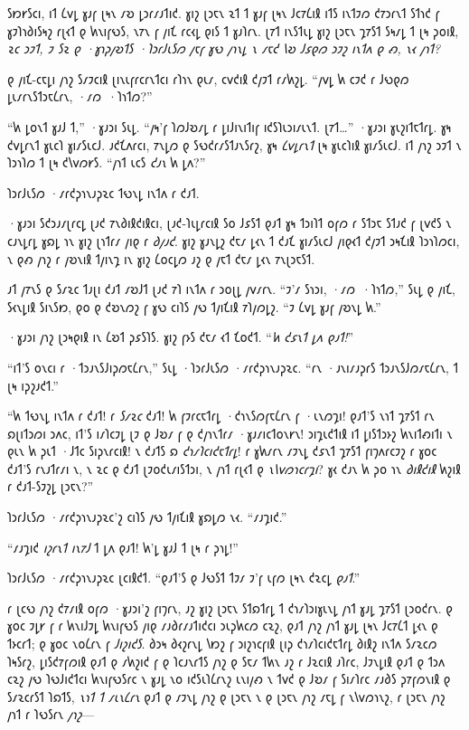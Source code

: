 𐑕𐑽𐑾𐑕𐑤𐑦, 𐑦𐑑 𐑖𐑫𐑛 𐑣𐑨𐑝 𐑚𐑰𐑯 𐑥𐑹 𐑛𐑮𐑩𐑥𐑨𐑑𐑦𐑒. 𐑣𐑦𐑟 𐑚𐑮𐑱𐑯 𐑷𐑑 𐑑 𐑣𐑨𐑝 𐑚𐑰𐑯 𐑓𐑤𐑳𐑖𐑦𐑙 𐑦𐑑𐑕 𐑦𐑯𐑑𐑲𐑼 𐑒𐑳𐑮𐑩𐑯𐑑 𐑕𐑑𐑪𐑒 𐑝 𐑣𐑲𐑐𐑪𐑔𐑦𐑕𐑰𐑟 𐑩𐑚𐑬𐑑 𐑞 𐑿𐑯𐑦𐑝𐑻𐑕, 𐑯𐑳𐑯 𐑝 𐑢𐑦𐑗 𐑩𐑤𐑬𐑛 𐑞𐑦𐑕 𐑑 𐑣𐑨𐑐𐑩𐑯. 𐑚𐑳𐑑 𐑦𐑯𐑕𐑑𐑧𐑛 𐑣𐑦𐑟 𐑚𐑮𐑱𐑯 𐑡𐑳𐑕𐑑 𐑕𐑰𐑥𐑛 𐑑 𐑚𐑰 𐑜𐑴𐑦𐑙, \emph{𐑷𐑤 𐑮𐑲𐑑, 𐑲 𐑕𐑷 𐑞 ·𐑣𐑪𐑜𐑢𐑹𐑑𐑕 ·𐑐𐑮𐑩𐑓𐑧𐑕𐑼 𐑢𐑱𐑝 𐑣𐑻 𐑢𐑪𐑯𐑛 𐑯 𐑥𐑱𐑒 𐑘𐑹 𐑓𐑭𐑞𐑼 𐑮𐑲𐑟 𐑦𐑯𐑑𐑵 𐑞 𐑺, 𐑯𐑬 𐑢𐑪𐑑?}

𐑞 𐑢𐑦𐑗-𐑤𐑱𐑛𐑦 𐑢𐑪𐑟 𐑕𐑥𐑲𐑤𐑦𐑙 𐑚𐑦𐑯𐑧𐑝𐑩𐑤𐑩𐑯𐑑𐑤𐑦 𐑩𐑐𐑪𐑯 𐑞𐑧𐑥, 𐑤𐑫𐑒𐑦𐑙 𐑒𐑢𐑲𐑑 𐑩𐑥𐑿𐑟𐑛. “𐑢𐑫𐑛 𐑿 𐑤𐑲𐑒 𐑩 𐑓𐑻𐑞𐑼 𐑛𐑧𐑥𐑩𐑯𐑕𐑑𐑮𐑱𐑖𐑩𐑯, ·𐑥𐑼~·𐑐𐑪𐑑𐑼?”

“𐑿 𐑛𐑴𐑯𐑑 𐑣𐑨𐑓 𐑑,” ·𐑣𐑨𐑮𐑦 𐑕𐑧𐑛. “𐑢𐑰'𐑝 𐑐𐑼𐑓𐑹𐑥𐑛 𐑩 𐑛𐑦𐑓𐑦𐑯𐑦𐑑𐑦𐑝 𐑦𐑒𐑕𐑐𐑧𐑮𐑦𐑥𐑧𐑯𐑑. 𐑚𐑳𐑑…” ·𐑣𐑨𐑮𐑦 𐑣𐑧𐑟𐑦𐑑𐑱𐑑𐑩𐑛. 𐑣𐑰 𐑒𐑫𐑛𐑩𐑯𐑑 𐑣𐑧𐑤𐑐 𐑣𐑦𐑥𐑕𐑧𐑤𐑓. 𐑨𐑒𐑗𐑵𐑩𐑤𐑦, 𐑳𐑯𐑛𐑼 𐑞 𐑕𐑻𐑒𐑩𐑥𐑕𐑑𐑨𐑯𐑕𐑩𐑟, 𐑣𐑰 \emph{𐑖𐑫𐑛𐑩𐑯𐑑} 𐑚𐑰 𐑣𐑧𐑤𐑐𐑦𐑙 𐑣𐑦𐑥𐑕𐑧𐑤𐑓. 𐑦𐑑 𐑢𐑪𐑟 𐑮𐑲𐑑 𐑯 𐑐𐑮𐑪𐑐𐑼 𐑑 𐑚𐑰 𐑒𐑘𐑫𐑼𐑾𐑕. “𐑢𐑪𐑑 𐑧𐑤𐑕 \emph{𐑒𐑨𐑯} 𐑿 𐑛𐑵?”

𐑐𐑮𐑩𐑓𐑧𐑕𐑼 ·𐑥𐑩𐑒𐑜𐑪𐑯𐑨𐑜𐑷𐑤 𐑑𐑻𐑯𐑛 𐑦𐑯𐑑𐑵 𐑩 𐑒𐑨𐑑.

·𐑣𐑨𐑮𐑦 𐑕𐑒𐑮𐑨𐑥𐑚𐑩𐑤𐑛 𐑚𐑨𐑒 𐑳𐑯𐑔𐑦𐑙𐑒𐑦𐑙𐑤𐑦, 𐑚𐑨𐑒-𐑐𐑧𐑛𐑩𐑤𐑦𐑙 𐑕𐑴 𐑓𐑭𐑕𐑑 𐑞𐑨𐑑 𐑣𐑰 𐑑𐑮𐑦𐑐𐑑 𐑴𐑝𐑼 𐑩 𐑕𐑑𐑮𐑱 𐑕𐑑𐑨𐑒 𐑝 𐑚𐑫𐑒𐑕 𐑯 𐑤𐑨𐑯𐑛𐑩𐑛 𐑣𐑸𐑛 𐑪𐑯 𐑣𐑦𐑟 𐑚𐑪𐑑𐑩𐑥 𐑢𐑦𐑞 𐑩 \emph{𐑔𐑢𐑨𐑒}. 𐑣𐑦𐑟 𐑣𐑨𐑯𐑛𐑟 𐑒𐑱𐑥 𐑛𐑬𐑯 𐑑 𐑒𐑨𐑗 𐑣𐑦𐑥𐑕𐑧𐑤𐑓 𐑢𐑦𐑞𐑬𐑑 𐑒𐑢𐑲𐑑 𐑮𐑰𐑗𐑦𐑙 𐑐𐑮𐑪𐑐𐑼𐑤𐑦, 𐑯 𐑞𐑺 𐑢𐑪𐑟 𐑩 𐑢𐑹𐑯𐑦𐑙 𐑑𐑢𐑦𐑯𐑡 𐑦𐑯 𐑣𐑦𐑟 𐑖𐑴𐑤𐑛𐑼 𐑨𐑟 𐑞 𐑢𐑱𐑑 𐑒𐑱𐑥 𐑛𐑬𐑯 𐑳𐑯𐑚𐑮𐑱𐑕𐑑.

𐑨𐑑 𐑢𐑳𐑯𐑕 𐑞 𐑕𐑥𐑷𐑤 𐑑𐑨𐑚𐑦 𐑒𐑨𐑑 𐑥𐑹𐑓𐑑 𐑚𐑨𐑒 𐑳𐑐 𐑦𐑯𐑑𐑵 𐑩 𐑮𐑴𐑚𐑛 𐑢𐑫𐑥𐑩𐑯. “𐑲'𐑥 𐑕𐑪𐑮𐑦, ·𐑥𐑼~·𐑐𐑪𐑑𐑼,” 𐑕𐑧𐑛 𐑞 𐑢𐑦𐑗, 𐑕𐑬𐑯𐑛𐑦𐑙 𐑕𐑦𐑯𐑕𐑽, 𐑞𐑴 𐑞 𐑒𐑹𐑯𐑼𐑟 𐑝 𐑣𐑻 𐑤𐑦𐑐𐑕 𐑢𐑻 𐑑𐑢𐑦𐑗𐑦𐑙 𐑳𐑐𐑢𐑼𐑛𐑟. “𐑲 𐑖𐑫𐑛 𐑣𐑨𐑝 𐑢𐑹𐑯𐑛 𐑿.”

·𐑣𐑨𐑮𐑦 𐑢𐑪𐑟 𐑚𐑮𐑰𐑞𐑦𐑙 𐑦𐑯 𐑖𐑹𐑑 𐑜𐑭𐑕𐑐𐑕. 𐑣𐑦𐑟 𐑝𐑶𐑕 𐑒𐑱𐑥 𐑬𐑑 𐑗𐑴𐑒𐑑. “\emph{𐑿 𐑒𐑭𐑯𐑑 \emph{𐑛𐑵} 𐑞𐑨𐑑!}”

“𐑦𐑑'𐑕 𐑴𐑯𐑤𐑦 𐑩 ·𐑑𐑮𐑨𐑯𐑕𐑓𐑦𐑜𐑼𐑱𐑖𐑩𐑯,” 𐑕𐑧𐑛 ·𐑐𐑮𐑩𐑓𐑧𐑕𐑼 ·𐑥𐑩𐑒𐑜𐑪𐑯𐑨𐑜𐑷𐑤. “𐑩𐑯 ·𐑨𐑯𐑦𐑥𐑨𐑜𐑩𐑕 𐑑𐑮𐑨𐑯𐑕𐑓𐑼𐑥𐑱𐑖𐑩𐑯, 𐑑 𐑚𐑰 𐑦𐑜𐑟𐑨𐑒𐑑.”

“𐑿 𐑑𐑻𐑯𐑛 𐑦𐑯𐑑𐑵 𐑩 𐑒𐑨𐑑! 𐑩 \emph{𐑕𐑥𐑷𐑤} 𐑒𐑨𐑑! 𐑿 𐑝𐑲𐑩𐑤𐑱𐑑𐑩𐑛 ·𐑒𐑪𐑯𐑕𐑼𐑝𐑱𐑖𐑩𐑯 𐑝 ·𐑧𐑯𐑼𐑡𐑦! 𐑞𐑨𐑑'𐑕 𐑯𐑪𐑑 𐑡𐑳𐑕𐑑 𐑩𐑯 𐑸𐑚𐑦𐑑𐑮𐑼𐑦 𐑮𐑵𐑤, 𐑦𐑑'𐑕 𐑦𐑥𐑐𐑤𐑲𐑛 𐑚𐑲 𐑞 𐑓𐑹𐑥 𐑝 𐑞 𐑒𐑢𐑪𐑯𐑑𐑩𐑥 ·𐑣𐑨𐑥𐑦𐑤𐑑𐑴𐑯𐑾𐑯! 𐑮𐑦𐑡𐑧𐑒𐑑𐑦𐑙 𐑦𐑑 𐑛𐑦𐑕𐑑𐑮𐑶𐑟 𐑿𐑯𐑦𐑑𐑺𐑦𐑑𐑦 𐑯 𐑞𐑧𐑯 𐑿 𐑜𐑧𐑑 ·𐑓𐑑𐑤 𐑕𐑦𐑜𐑯𐑩𐑤𐑦𐑙! 𐑯 𐑒𐑨𐑑𐑕 𐑸 \emph{𐑒𐑪𐑥𐑐𐑤𐑦𐑒𐑱𐑑𐑩𐑛}! 𐑩 𐑣𐑿𐑥𐑩𐑯 𐑥𐑲𐑯𐑛 𐑒𐑭𐑯𐑑 𐑡𐑳𐑕𐑑 𐑝𐑦𐑠𐑵𐑩𐑤𐑲𐑟 𐑩 𐑣𐑴𐑤 𐑒𐑨𐑑'𐑕 𐑩𐑯𐑨𐑑𐑩𐑥𐑦 𐑯, 𐑯 𐑷𐑤 𐑞 𐑒𐑨𐑑 𐑚𐑲𐑴𐑒𐑧𐑥𐑦𐑕𐑑𐑮𐑦, 𐑯 𐑢𐑪𐑑 𐑩𐑚𐑬𐑑 𐑞 \emph{𐑯𐑘𐑫𐑼𐑪𐑤𐑩𐑡𐑦}? 𐑣𐑬 𐑒𐑨𐑯 𐑿 𐑜𐑴 𐑪𐑯 \emph{𐑔𐑦𐑙𐑒𐑦𐑙} 𐑿𐑟𐑦𐑙 𐑩 𐑒𐑨𐑑-𐑕𐑲𐑟𐑛 𐑚𐑮𐑱𐑯?”

𐑐𐑮𐑩𐑓𐑧𐑕𐑼 ·𐑥𐑩𐑒𐑜𐑪𐑯𐑨𐑜𐑷𐑤'𐑟 𐑤𐑦𐑐𐑕 𐑢𐑻 𐑑𐑢𐑦𐑗𐑦𐑙 𐑣𐑸𐑛𐑼 𐑯𐑬. “𐑥𐑨𐑡𐑦𐑒.”

“𐑥𐑨𐑡𐑦𐑒 \emph{𐑦𐑟𐑩𐑯𐑑 𐑦𐑯𐑳𐑓} 𐑑 𐑛𐑵 𐑞𐑨𐑑! 𐑿'𐑛 𐑣𐑨𐑓 𐑑 𐑚𐑰 𐑩 𐑜𐑪𐑛!”

𐑐𐑮𐑩𐑓𐑧𐑕𐑼 ·𐑥𐑩𐑒𐑜𐑪𐑯𐑨𐑜𐑷𐑤 𐑚𐑤𐑦𐑙𐑒𐑑. “𐑞𐑨𐑑'𐑕 𐑞 𐑓𐑻𐑕𐑑 𐑑𐑲𐑥 𐑲'𐑝 𐑧𐑝𐑼 𐑚𐑰𐑯 𐑒𐑷𐑤𐑛 \emph{𐑞𐑨𐑑}.”

𐑩 𐑚𐑤𐑻 𐑢𐑪𐑟 𐑒𐑳𐑥𐑦𐑙 𐑴𐑝𐑼 ·𐑣𐑨𐑮𐑦'𐑟 𐑝𐑦𐑠𐑩𐑯, 𐑨𐑟 𐑣𐑦𐑟 𐑚𐑮𐑱𐑯 𐑕𐑑𐑸𐑑𐑩𐑛 𐑑 𐑒𐑪𐑥𐑐𐑮𐑦𐑣𐑧𐑯𐑛 𐑢𐑪𐑑 𐑣𐑨𐑛 𐑡𐑳𐑕𐑑 𐑚𐑮𐑴𐑒𐑩𐑯. 𐑞 𐑣𐑴𐑤 𐑲𐑛𐑾 𐑝 𐑩 𐑿𐑯𐑦𐑓𐑲𐑛 𐑿𐑯𐑦𐑝𐑻𐑕 𐑢𐑦𐑞 𐑥𐑨𐑔𐑩𐑥𐑨𐑑𐑦𐑒𐑤𐑦 𐑮𐑧𐑜𐑿𐑤𐑼 𐑤𐑷𐑟, 𐑞𐑨𐑑 𐑢𐑪𐑟 𐑢𐑪𐑑 𐑣𐑨𐑛 𐑚𐑰𐑯 𐑓𐑤𐑳𐑖𐑑 𐑛𐑬𐑯 𐑞 𐑑𐑶𐑤𐑩𐑑; 𐑞 𐑣𐑴𐑤 𐑯𐑴𐑖𐑩𐑯 𐑝 \emph{𐑓𐑦𐑟𐑦𐑒𐑕}. 𐑔𐑮𐑰 𐑔𐑬𐑟𐑩𐑯𐑛 𐑘𐑽𐑟 𐑝 𐑮𐑦𐑟𐑪𐑤𐑝𐑦𐑙 𐑚𐑦𐑜 𐑒𐑪𐑥𐑐𐑤𐑦𐑒𐑱𐑑𐑩𐑛 𐑔𐑦𐑙𐑟 𐑦𐑯𐑑𐑵 𐑕𐑥𐑷𐑤𐑼 𐑐𐑰𐑕𐑩𐑟, 𐑛𐑦𐑕𐑒𐑳𐑝𐑼𐑦𐑙 𐑞𐑨𐑑 𐑞 𐑥𐑿𐑟𐑦𐑒 𐑝 𐑞 𐑐𐑤𐑨𐑯𐑩𐑑𐑕 𐑢𐑪𐑟 𐑞 𐑕𐑱𐑥 𐑑𐑿𐑯 𐑨𐑟 𐑩 𐑓𐑷𐑤𐑦𐑙 𐑨𐑐𐑩𐑤, 𐑓𐑲𐑯𐑛𐑦𐑙 𐑞𐑨𐑑 𐑞 𐑑𐑮𐑵 𐑤𐑷𐑟 𐑢𐑻 𐑐𐑻𐑓𐑦𐑒𐑑𐑤𐑦 𐑿𐑯𐑦𐑝𐑻𐑕𐑩𐑤 𐑯 𐑣𐑨𐑛 𐑯𐑴 𐑦𐑒𐑕𐑧𐑐𐑖𐑩𐑯𐑟 𐑧𐑯𐑦𐑢𐑺 𐑯 𐑑𐑫𐑒 𐑞 𐑓𐑹𐑥 𐑝 𐑕𐑦𐑥𐑐𐑩𐑤 𐑥𐑨𐑔𐑕 𐑜𐑳𐑝𐑼𐑯𐑦𐑙 𐑞 𐑕𐑥𐑷𐑤𐑩𐑕𐑑 𐑐𐑸𐑑𐑕, \emph{𐑯𐑪𐑑 𐑑 𐑥𐑧𐑯𐑖𐑩𐑯} 𐑞𐑨𐑑 𐑞 𐑥𐑲𐑯𐑛 𐑢𐑪𐑟 𐑞 𐑚𐑮𐑱𐑯 𐑯 𐑞 𐑚𐑮𐑱𐑯 𐑢𐑪𐑟 𐑥𐑱𐑛 𐑝 𐑯𐑘𐑫𐑼𐑪𐑯𐑟, 𐑩 𐑚𐑮𐑱𐑯 𐑢𐑪𐑟 𐑢𐑪𐑑 𐑩 𐑐𐑻𐑕𐑩𐑯 \emph{𐑢𐑪𐑟}—


